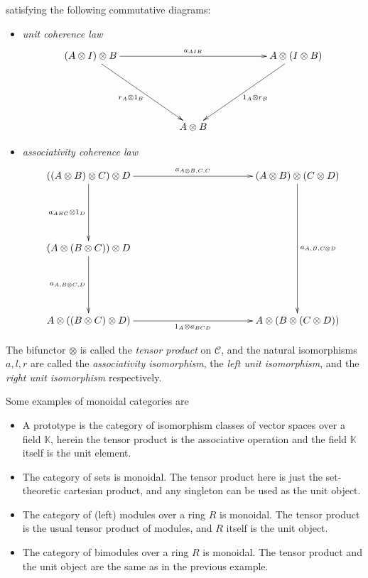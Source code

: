 \documentclass[10pt]{article}
\theoremstyle{plain}
\theoremstyle{definition}
\theoremstyle{remark}
\begin{document}
satisfying the following commutative diagrams:
\begin{itemize}
\item \emph{unit coherence law}
$$\xymatrix@+=2cm{(A\otimes I)\otimes B \ar[rr]^{a_{AIB}} \ar[dr]_{r_A\otimes 1_B} & & A\otimes (I\otimes B) \ar[dl]^{1_A \otimes r_B} \\ & A\otimes B & }$$
\item \emph{associativity coherence law}
$$\xymatrix@+=2cm{((A\otimes B)\otimes C)\otimes D \ar[rr]^{a_{A\otimes B,C,C}} \ar[d]_{a_{ABC}\otimes 1_D} &&  (A\otimes B)\otimes (C\otimes D) \ar[dd]^{a_{A,B,C\otimes D}} \\
(A\otimes (B\otimes C))\otimes D \ar[d]_{a_{A,B\otimes C,D}} && \\
A\otimes ((B\otimes C)\otimes D) \ar[rr]_{1_A\otimes a_{BCD}} && A \otimes (B\otimes (C\otimes D))}$$
\end{itemize}
The bifunctor $\otimes$ is called the \emph{tensor product} on $\mathcal{C}$, and the natural isomorphisms $a,l,r$ are called the \emph{associativity isomorphism}, the \emph{left unit isomorphism}, and the \emph{right unit isomorphism} respectively.

Some examples of monoidal categories are
\begin{itemize}
\item
A prototype is the category of isomorphism classes of vector spaces over a field $\mathbb{K}$, herein the tensor product is the associative operation and the field $\mathbb{K}$ itself is the unit element.
\item
The category of sets is monoidal.  The tensor product here is just the set-theoretic cartesian product, and any singleton can be used as the unit object.
\item
The category of (left) modules over a ring $R$ is monoidal.  The tensor product is the usual tensor product of modules, and $R$ itself is the unit object.
\item
The category of bimodules over a ring $R$ is monoidal.  The tensor product and the unit object are the same as in the previous example.
\end{itemize}
\end{document}
